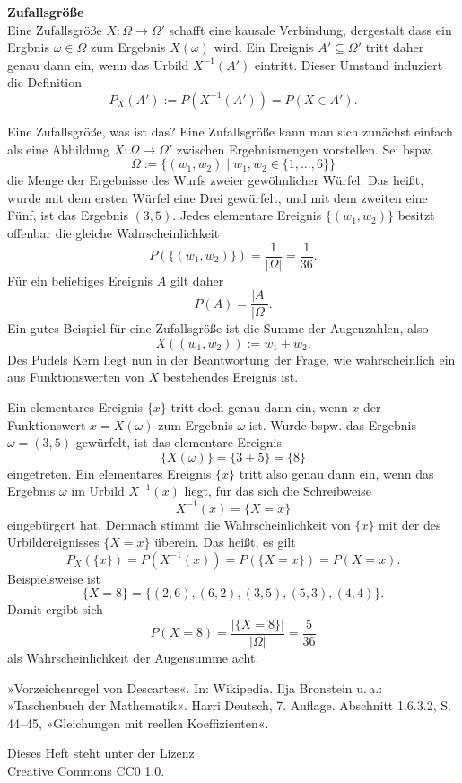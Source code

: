 \documentclass[paper=180mm:225mm,pagesize=auto,fleqn,twoside,11pt,dvipdfmx]{scrartcl}
\theoremstyle{rmbox}
\newenvironment{Rezept}[1]{\strong{#1}\\}{}
\newcommand{\strong}[1]{\textsf{\textbf{#1}}}
\begin{document}
\begin{Rezept}{Zufallsgröße}
Eine Zufallsgröße $X\colon\Omega\to\Omega'$ schafft eine kausale
Verbindung, dergestalt dass ein Ergbnis $\omega\in\Omega$ zum
Ergebnis $X(\omega)$ wird. Ein Ereignis $A'\subseteq\Omega'$
tritt daher genau dann ein, wenn das Urbild $X^{-1}(A')$ eintritt.
Dieser Umstand induziert die Definition
\[P_X(A') := P(X^{-1}(A')) = P(X\in A').\]
\end{Rezept}

\noindent
Eine Zufallsgröße, was ist das? Eine Zufallsgröße kann man sich
zunächst einfach als eine Abbildung $X\colon\Omega\to\Omega'$ zwischen
Ergebnismengen vorstellen. Sei bspw.
\[\Omega := \{(w_1,w_2)\mid w_1,w_2\in\{1,\ldots,6\}\}\]
die Menge der Ergebnisse des Wurfs zweier gewöhnlicher
Würfel. Das heißt, wurde mit dem ersten Würfel eine Drei
gewürfelt, und mit dem zweiten eine Fünf, ist das Ergebnis $(3, 5)$.
Jedes elementare Ereignis $\{(w_1,w_2)\}$ besitzt offenbar
die gleiche Wahrscheinlichkeit%
\[P(\{(w_1,w_2)\}) = \frac{1}{|\Omega|} = \frac{1}{36}.\]
Für ein beliebiges Ereignis $A$ gilt daher%
\[P(A) = \frac{|A|}{|\Omega|}.\]
Ein gutes Beispiel für eine Zufallsgröße ist die Summe der
Augenzahlen, also%
\[X((w_1,w_2)) := w_1 + w_2.\]
Des Pudels Kern liegt nun in der Beantwortung der Frage, wie
wahrscheinlich ein aus Funktionswerten von $X$ bestehendes
Ereignis ist.

Ein elementares Ereignis $\{x\}$ tritt doch genau dann ein,
wenn $x$ der Funktionswert $x=X(\omega)$ zum Ergebnis
$\omega$ ist. Wurde bspw. das Ergebnis $\omega=(3, 5)$
gewürfelt, ist das elementare Ereignis%
\[\{X(\omega)\} = \{3 + 5\} = \{8\}\]
eingetreten.
Ein elementares Ereignis $\{x\}$ tritt also genau dann ein, wenn das
Ergebnis $\omega$ im Urbild $X^{-1}(x)$ liegt, für das sich die
Schreibweise%
\[X^{-1}(x)=\{X=x\}\]
eingebürgert hat. Demnach stimmt die Wahrscheinlichkeit von $\{x\}$
mit der des Urbildereignisses $\{X=x\}$ überein. Das heißt, es gilt%
\[P_X(\{x\}) = P(X^{-1}(x)) = P(\{X=x\}) = P(X=x).\]
Beispielsweise ist
\[\{X=8\} = \{(2,6), (6,2), (3,5), (5,3), (4,4)\}.\]
Damit ergibt sich
\[P(X=8) = \frac{|\{X=8\}|}{|\Omega|} = \frac{5}{36}\]
als Wahrscheinlichkeit der Augensumme acht.

\begin{thebibliography}{00}
 »Vorzeichenregel von Descartes«. In: Wikipedia.
 Ilja Bronstein u.\,a.: »Taschenbuch der Mathematik«.
Harri Deutsch, 7. Auflage. Abschnitt 1.6.3.2, S. 44--45, »Gleichungen mit
reellen Koeffizienten«.
\end{thebibliography}


\vfill\noindent
Dieses Heft steht unter der Lizenz\\
Creative Commons CC0 1.0.
\end{document}
